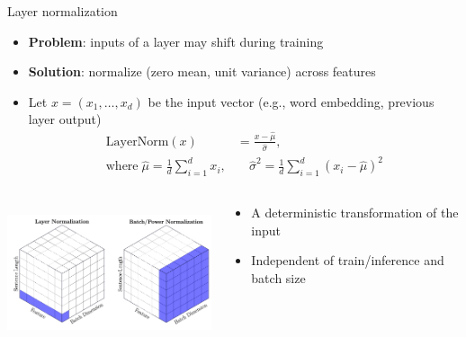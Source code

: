 \documentclass[usenames,dvipsnames,notes,11pt,aspectratio=169,hyperref={colorlinks=true, linkcolor=blue}]{beamer}
\begin{document}
\begin{frame}
    {Layer normalization}
    
    \begin{itemize}
        \item {\bf Problem}: inputs of a layer may shift during training
        \item {\bf Solution}: normalize (zero mean, unit variance) across features 
        \item Let $x=(x_1,\ldots,x_d)$ be the input vector (e.g., word embedding, previous layer output)
            \vspace{-1em}
            \begin{align*}
                \mathrm{LayerNorm}(x) &= \frac{x-\hat{\mu}}{\hat{\sigma}},\\
                \text{where} \; \hat{\mu} = \frac{1}{d}{\sum_{i=1}^d x_i}, &\quad \hat{\sigma}^2 = \frac{1}{d}{\sum_{i=1}^d (x_i-\hat{\mu})^2}
            \end{align*}
    \end{itemize}
    \pause
  
    \begin{columns}
        \begin{column}{0.5\textwidth}
            \includegraphics[height=4cm]{figures/batchnorm}
        \end{column}
        \begin{column}{0.5\textwidth}
    \begin{itemize}
    \item A deterministic transformation of the input
    \item Independent of train/inference and batch size
    \end{itemize}
        \end{column}
    \end{columns}
\end{frame}
\end{document}
